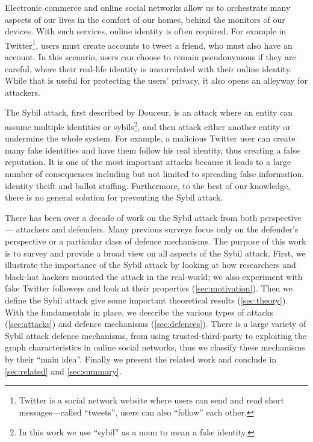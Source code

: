 Electronic commerce and online social networks allow us to orchestrate many
aspects of our lives in the comfort of our homes, behind the monitors of our
devices. With such services, online identity is often required. For example in
Twitter\footnote{Twitter is a social network website where users can send and
  read short messages---called ``tweets'', users can also ``follow'' each
  other.}, users must create accounts to tweet a friend, who must also have an
account. In this scenario, users can choose to remain pseudonymous if they are
careful, where their real-life identity is uncorrelated with their online
identity. While that is useful for protecting the users' privacy, it also opens
an alleyway for attackers.

The Sybil attack, first described by Douceur\cite{douceur2002sybil}, is an
attack where an entity can assume multiple identities or sybils\footnote{In this
  work we use ``sybil'' as a noun to mean a fake identity.}, and then attack
either another entity or undermine the whole system. For example, a malicious
Twitter user can create many fake identities and have them follow his real
identity, thus creating a false reputation. It is one of the most important
attacks because it leads to a large number of consequences including but not
limited to spreading false information, identity theift\cite{bilge2009all} and
ballot stuffing\cite{bhattacharjee2005avoiding}. Furthermore, to the best of our
knowledge, there is no general solution for preventing the Sybil attack.

There has been over a decade of work on the Sybil attack from both perspective
--- attackers and defenders. Many previous surveys focus only on the defender's
perspective or a particular class of defence mechanisms. The purpose of this
work is to survey and provide a broad view on all aspects of the Sybil attack.
First, we illustrate the importance of the Sybil attack by looking at how
researchers and black-hat hackers mounted the attack in the real-world; we also
experiment with fake Twitter followers and look at their properties
(\autoref{sec:motivation}). Then we define the Sybil attack give some important
theoretical results (\autoref{sec:theory}). With the fundamentals in place, we
describe the various types of attacks (\autoref{sec:attacks}) and defence
mechanisms (\autoref{sec:defences}). There is a large variety of Sybil attack
defence mechanisms, from using trusted-third-party to exploiting the graph
characteristics in online social networks, thus we classify these mechanisms by
their ``main idea''. Finally we present the related work and conclude in
\autoref{sec:related} and \autoref{sec:summary}.

